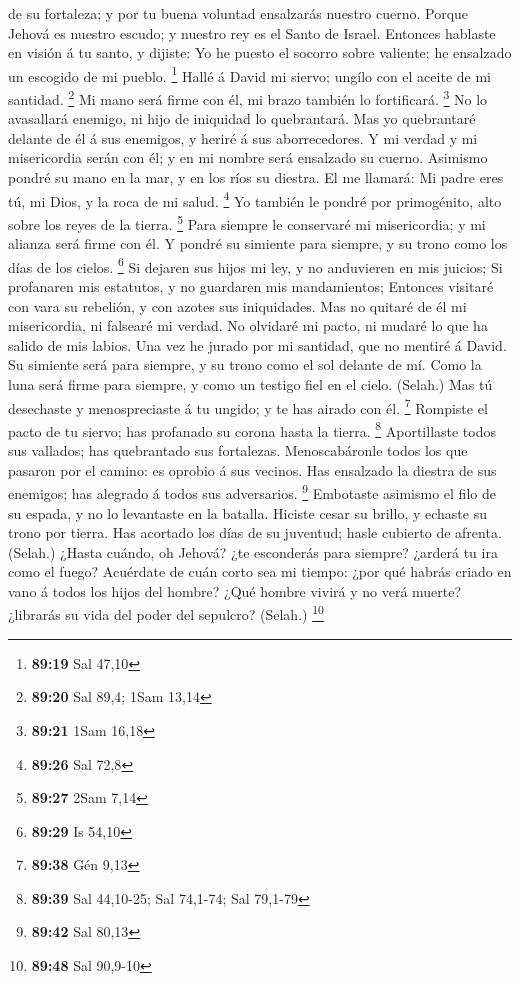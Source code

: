 de su fortaleza; y por tu buena voluntad ensalzarás nuestro cuerno.
 Porque Jehová es nuestro escudo; y nuestro rey es el Santo
de Israel.  Entonces hablaste en visión á tu santo, y
dijiste: Yo he puesto el socorro sobre valiente; he ensalzado un
escogido de mi pueblo. \footnote{\textbf{89:19} Sal 47,10} 
Hallé á David mi siervo; ungílo con el aceite de mi santidad.
\footnote{\textbf{89:20} Sal 89,4; 1Sam 13,14}  Mi mano
será firme con él, mi brazo también lo fortificará. \footnote{\textbf{89:21}
  1Sam 16,18}  No lo avasallará enemigo, ni hijo de
iniquidad lo quebrantará.  Mas yo quebrantaré delante de él
á sus enemigos, y heriré á sus aborrecedores.  Y mi verdad
y mi misericordia serán con él; y en mi nombre será ensalzado su cuerno.
 Asimismo pondré su mano en la mar, y en los ríos su
diestra.  El me llamará: Mi padre eres tú, mi Dios, y la
roca de mi salud. \footnote{\textbf{89:26} Sal 72,8}  Yo
también le pondré por primogénito, alto sobre los reyes de la tierra.
\footnote{\textbf{89:27} 2Sam 7,14}  Para siempre le
conservaré mi misericordia; y mi alianza será firme con él.
 Y pondré su simiente para siempre, y su trono como los
días de los cielos. \footnote{\textbf{89:29} Is 54,10}  Si
dejaren sus hijos mi ley, y no anduvieren en mis juicios; 
Si profanaren mis estatutos, y no guardaren mis mandamientos;
 Entonces visitaré con vara su rebelión, y con azotes sus
iniquidades.  Mas no quitaré de él mi misericordia, ni
falsearé mi verdad.  No olvidaré mi pacto, ni mudaré lo que
ha salido de mis labios.  Una vez he jurado por mi
santidad, que no mentiré á David.  Su simiente será para
siempre, y su trono como el sol delante de mí.  Como la
luna será firme para siempre, y como un testigo fiel en el cielo.
(Selah.)  Mas tú desechaste y menospreciaste á tu ungido; y
te has airado con él. \footnote{\textbf{89:38} Gén 9,13} 
Rompiste el pacto de tu siervo; has profanado su corona hasta la tierra.
\footnote{\textbf{89:39} Sal 44,10-25; Sal 74,1-74; Sal 79,1-79}
 Aportillaste todos sus vallados; has quebrantado sus
fortalezas.  Menoscabáronle todos los que pasaron por el
camino: es oprobio á sus vecinos.  Has ensalzado la diestra
de sus enemigos; has alegrado á todos sus adversarios. \footnote{\textbf{89:42}
  Sal 80,13}  Embotaste asimismo el filo de su espada, y no
lo levantaste en la batalla.  Hiciste cesar su brillo, y
echaste su trono por tierra.  Has acortado los días de su
juventud; hasle cubierto de afrenta. (Selah.)  ¿Hasta
cuándo, oh Jehová? ¿te esconderás para siempre? ¿arderá tu ira como el
fuego?  Acuérdate de cuán corto sea mi tiempo: ¿por qué
habrás criado en vano á todos los hijos del hombre?  ¿Qué
hombre vivirá y no verá muerte? ¿librarás su vida del poder del
sepulcro? (Selah.) \footnote{\textbf{89:48} Sal 90,9-10}

